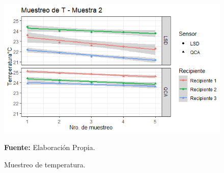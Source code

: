     \begin{figure}[H]
        \centering
        \includegraphics[width=0.75\linewidth]{Imagenes/cap4/T_M2.png}
        \caption {Muestreo de temperatura. }{\textbf{Fuente:}
        Elaboraci\'on Propia. }
        \label{fig:M2T}
    \end{figure}

